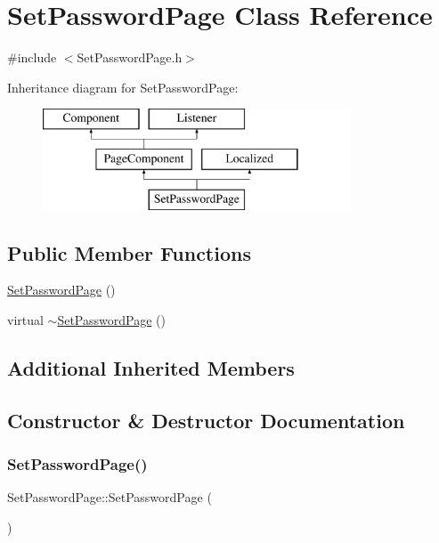 \hypertarget{classSetPasswordPage}{}\section{Set\+Password\+Page Class Reference}
\label{classSetPasswordPage}


{\ttfamily \#include $<$Set\+Password\+Page.\+h$>$}

Inheritance diagram for Set\+Password\+Page\+:\begin{figure}[H]
\begin{center}
\leavevmode
\includegraphics[height=3.000000cm]{classSetPasswordPage}
\end{center}
\end{figure}
\subsection*{Public Member Functions}
\begin{DoxyCompactItemize}
\item 
\mbox{\hyperlink{classSetPasswordPage_aa2714f7f41e4ebbb67baffa69f0a9e2d}{Set\+Password\+Page}} ()
\item 
virtual \mbox{\hyperlink{classSetPasswordPage_a97defbb2e5484bc6105cfec5327e569a}{$\sim$\+Set\+Password\+Page}} ()
\end{DoxyCompactItemize}
\subsection*{Additional Inherited Members}


\subsection{Constructor \& Destructor Documentation}
\mbox{\label{classSetPasswordPage_aa2714f7f41e4ebbb67baffa69f0a9e2d}} 
\subsubsection{\texorpdfstring{Set\+Password\+Page()}{SetPasswordPage()}}
{\footnotesize\ttfamily Set\+Password\+Page\+::\+Set\+Password\+Page (\begin{DoxyParamCaption}{ }\end{DoxyParamCaption})}

